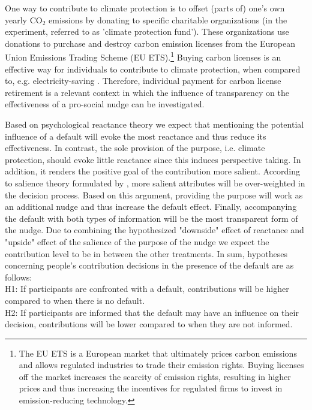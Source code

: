 \documentclass[review, authoryear,12pt]{elsarticle}
\begin{document}
One way to contribute to climate protection is to offset (parts of) one's own yearly CO$_2$ emissions by donating to specific charitable organizations (in the experiment, referred to as 'climate protection fund'). These organizations use donations to purchase and destroy carbon emission licenses from the European Union Emissions Trading Scheme (EU ETS).\footnote{The EU ETS is a European market that ultimately prices carbon emissions and allows regulated industries to trade their emission rights. Buying licenses off the market increases the scarcity of emission rights, resulting in higher prices and thus increasing the incentives for regulated firms to invest in emission-reducing technology.} Buying carbon licenses is an effective way for individuals to contribute to climate protection, when compared to, e.g. electricity-saving \citep{Perino.2015}. Therefore, individual payment for carbon license retirement is a relevant context in which the influence of transparency on the effectiveness of a pro-social nudge can be investigated.

Based on psychological reactance theory we expect that mentioning the potential influence of a default will evoke the most reactance and thus reduce its effectiveness. In contrast, the sole provision of the purpose, i.e. climate protection, should evoke little reactance since this induces perspective taking. In addition, it renders the positive goal of the contribution more salient. According to salience theory formulated by \cite{Bordalo.2012}, more salient attributes will be over-weighted in the decision process. Based on this argument, providing the purpose will work as an additional nudge and thus increase the default effect. Finally, accompanying the default with both types of information will be the most transparent form of the nudge. Due to combining the hypothesized "downside" effect of reactance and "upside" effect of the salience of the purpose of the nudge we expect the contribution level to be in between the other treatments. In sum, hypotheses concerning people's contribution decisions in the presence of the default are as follows: \\

H1: If participants are confronted with a default, contributions will be higher compared to when there is no default. \\

H2: If participants are informed that the default may have an influence on their decision, contributions will be lower compared to when they are not informed. \\
\end{document}
